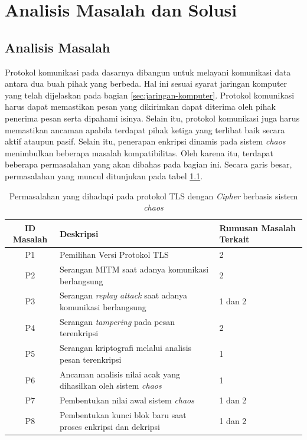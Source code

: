 

\chapter{Analisis Masalah dan Solusi}

\section{Analisis Masalah}
\label{sec:analisis-masalah}

Protokol komunikasi pada dasarnya dibangun untuk melayani komunikasi data antara dua buah pihak yang berbeda. Hal ini sesuai syarat jaringan komputer yang telah dijelaskan pada bagian \ref{sec:jaringan-komputer}. Protokol komunikasi harus dapat memastikan pesan yang dikirimkan dapat diterima oleh pihak penerima pesan serta dipahami isinya. Selain itu, protokol komunikasi juga harus memastikan ancaman apabila terdapat pihak ketiga yang terlibat baik secara aktif ataupun pasif. Selain itu, penerapan enkripsi dinamis pada sistem \emph{chaos} menimbulkan beberapa masalah kompatibilitas. Oleh karena itu, terdapat beberapa permasalahan yang akan dibahas pada bagian ini. Secara garis besar, permasalahan yang muncul ditunjukan pada tabel \ref{tab:permasalahan}.

\begin{table}[!h]
  \centering
  \caption{Permasalahan yang dihadapi pada protokol TLS dengan \emph{Cipher} berbasis sistem \emph{chaos}} \label{tab:permasalahan}
  \begin{tabular}{|c|p{6cm}|p{4cm}|}
    \hline
    \textbf{ID Masalah} & \textbf{Deskripsi} & \textbf{Rumusan Masalah Terkait} \\
    \hline
    P1 & Pemilihan Versi Protokol TLS & 2 \\ \hline
    P2 & Serangan MITM saat adanya komunikasi berlangsung & 2 \\ \hline
    P3 & Serangan \emph{replay attack} saat adanya komunikasi berlangsung & 1 dan 2 \\ \hline
    P4 & Serangan \emph{tampering} pada pesan terenkripsi & 2 \\ \hline
    P5 & Serangan kriptografi melalui analisis pesan terenkripsi & 1 \\ \hline
    P6 & Ancaman analisis nilai acak yang dihasilkan oleh sistem \emph{chaos} & 1 \\ \hline
    P7 & Pembentukan nilai awal sistem \emph{chaos} & 1 dan 2 \\ \hline
    P8 & Pembentukan kunci blok baru saat proses enkripsi dan dekripsi & 1 dan 2 \\ \hline
  \end{tabular}
\end{table}

